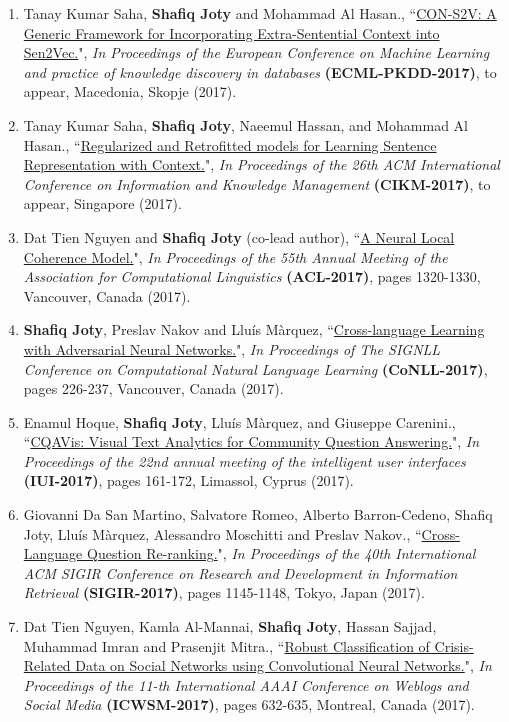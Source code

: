 \documentclass[paper=letter,fontsize=11pt]{scrartcl} %
\newcommand{\PaperEntry}[7]{
		\noindent #1, ``\href{#7}{#2}", \textit{#3} \textbf{#4}, #5 (#6).}
\begin{document}
\begin{enumerate}

\item \PaperEntry{Tanay Kumar Saha, \textbf{Shafiq Joty} and Mohammad Al Hasan.} {CON-S2V: A Generic Framework for Incorporating Extra-Sentential Context into Sen2Vec.}{In Proceedings of the European Conference on Machine Learning and practice of knowledge discovery in databases} {(ECML-PKDD-2017)}{to appear, Macedonia, Skopje}{2017}  
{https://raihanjoty.github.io/papers/saha-joty-hasan-ecml-17.pdf}

\item \PaperEntry{Tanay Kumar Saha, \textbf{Shafiq Joty}, Naeemul Hassan, and Mohammad Al Hasan.} {Regularized and Retrofitted models for Learning Sentence Representation with Context.}{In Proceedings of the 26th ACM International Conference on Information and Knowledge Management} {(CIKM-2017)}{to appear, Singapore}{2017}  
{http://alt.qcri.org/~sjoty/paper/sen2vec-reg.pdf}

\item \PaperEntry{Dat Tien Nguyen and \textbf{Shafiq Joty} (co-lead author)}{A Neural Local Coherence Model.}{In Proceedings of the 55th Annual Meeting of the Association for Computational Linguistics} {(ACL-2017)}{pages 1320-1330, Vancouver, Canada}{2017}  
{http://www.aclweb.org/anthology/P/P17/P17-1121.pdf}

\item \PaperEntry{\textbf{Shafiq Joty}, Preslav Nakov and Lluís Màrquez}{Cross-language Learning with Adversarial Neural Networks.}{In Proceedings of The SIGNLL Conference on Computational Natural Language Learning} {(CoNLL-2017)}{pages 226-237, Vancouver, Canada}{2017}  
{http://www.aclweb.org/anthology/K/K17/K17-1024.pdf}

\item \PaperEntry{Enamul Hoque, \textbf{Shafiq Joty}, Lluís Màrquez, and Giuseppe Carenini.}{CQAVis: Visual Text Analytics for Community Question Answering.}{In Proceedings of the 22nd annual meeting of the intelligent user interfaces} {(IUI-2017)}{pages 161-172, Limassol, Cyprus}{2017}
{http://dl.acm.org/authorize.cfm?key=N22238}

\item \PaperEntry{Giovanni Da San Martino, Salvatore Romeo, Alberto Barron-Cedeno, Shafiq Joty, Lluís Màrquez, Alessandro Moschitti and Preslav Nakov.}{Cross-Language Question Re-ranking.}{In Proceedings of the 40th International ACM SIGIR Conference on Research and Development in Information Retrieval} {(SIGIR-2017)}{pages 1145-1148, Tokyo, Japan}{2017}
{http://dl.acm.org/citation.cfm?doid=3077136.3080743}

\item \PaperEntry{Dat Tien Nguyen, Kamla Al-Mannai, \textbf{Shafiq Joty}, Hassan Sajjad, Muhammad Imran and Prasenjit Mitra.}{Robust Classification of Crisis-Related Data on Social Networks using Convolutional Neural Networks.}{In Proceedings of the 11-th International AAAI Conference on Weblogs and Social Media } {(ICWSM-2017)}{pages 632-635, Montreal, Canada}{2017}
{http://mimran.me/papers/robust_classification_of_crisis_data_on_social_media_using_cnn_icwsm2017.pdf}

\end{enumerate}
\end{document}
